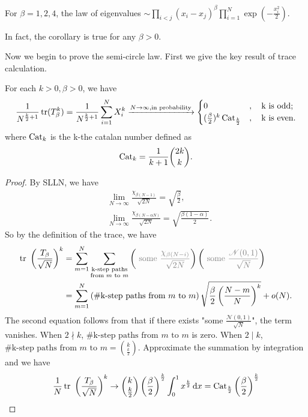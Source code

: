 \begin{cor}
    For $\beta = 1, 2, 4$, the law of eigenvalues $\sim \prod_{i<j} (x_i-x_j)^\beta \prod_{i=1}^N\exp(-\frac{x_i^2}{2})$.
\end{cor}

\begin{thm}
    In fact, the corollary is true for any $\beta>0$.
\end{thm}

Now we begin to prove the semi-circle law. First we give the key result of trace calculation.
\begin{thm}
    For each $k>0, \beta>0$, we have
    \[
    \frac{1}{N^{\frac{k}{2}+1}} \operatorname{tr}(T_\beta^k)=
    \frac{1}{N^{\frac{k}{2}+1}}\sum_{i=1}^N X_i^k
    \xrightarrow{N\to \infty, \text{in probability}} 
    \begin{cases}
        0&, \quad \text{k is odd}; \\
        (\frac{\beta}{2})^k \operatorname{Cat}_{\frac{k}{2}}&, 
        \quad \text{k is even}.
    \end{cases}
    \]
    where $\operatorname{Cat}_k$ is the k-the catalan number defined as
    \[
    \operatorname{Cat}_k = \frac{1}{k+1} \binom{2k}{k}.
    \]
\end{thm}

\begin{proof}
    By SLLN, we have
    \begin{align*}
        &\lim_{N\to \infty} \frac{\chi_{\beta(N-1)}}{\sqrt{2N}} = \sqrt{\frac{\beta}{2}},\\
        &\lim_{N\to \infty} \frac{\chi_{\beta(N-\alpha N)}}{\sqrt{2N}} = \sqrt{\frac{\beta(1-\alpha)}{2}}.
    \end{align*}
    So by the definition of the trace, we have
    \begin{align*}
    \tr \ \left(\frac{T_\beta}{\sqrt{N}}\right)^k 
    &= \sum_{m=1}^N \sum_{\substack{\text{k-step paths} \\ \text{from } m \text{ to } m}} 
    \left(\ \textcolor{gray}{ \text{some} 
    \ \frac{\chi_{\beta(N-i)}}{\sqrt{2N}} } \right)
    \left(\ \textcolor{gray}{ \text{some} 
    \ \frac{\mathcal{N}(0,1)}{\sqrt{N}} }\right)\\
    &=\sum_{m=1}^N \left( \# {\text{k-step paths from } m \text{ to } m} \right) \sqrt{\frac{\beta}{2}\left( \frac{N-m}{N} \right)^k} + o(N).
    \end{align*}
    The second equation follows from that if there exists "some $\frac{\mathcal{N}(0,1)}{\sqrt{N}}$", the term vanishes. 
    When $2 \nmid k$, $\# {\text{k-step paths from } m \text{ to } m}$ is zero.
    When $2\mid k$, $\# {\text{k-step paths from } m \text{ to } m} = \binom{k}{\frac{k}{2}}$. Approximate the summation by integration and we have
    \[
    \frac{1}{N} \tr \ \left(\frac{T_\beta}{\sqrt{N}}\right)^k \to \binom{k}{\frac{k}{2}} \left(\frac{\beta}{2}\right)^{\frac{k}{2}} \int_0^1 x^{\frac{k}{2}}\dd x = \Cat_{\frac{k}{2}} \left(\frac{\beta}{2}\right)^{\frac{k}{2}}
    \]
\end{proof}

